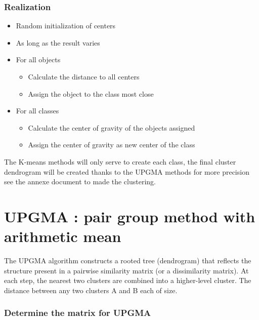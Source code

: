 \documentclass[12pt]{report}
\begin{document}
\subsubsection*{Realization}
\begin{itemize}
\item Random initialization of centers
\item As long as the result varies
\end{itemize}
\begin{itemize}
\item For all objects
\begin{itemize}
\item Calculate the distance to all centers
\item Assign the object to the class most close
\end{itemize}
\item For all classes
\begin{itemize}
\item Calculate the center of gravity of the objects assigned
\item Assign the center of gravity as new center of the class
\end{itemize}
\end{itemize}

\vspace{\baselineskip}

The K-means methods will only serve to create each class, the final cluster dendrogram will be created thanks to the UPGMA methods for more precision see the annexe document to made the clustering.

\newpage

\section*{UPGMA : pair group method with arithmetic mean}

The UPGMA algorithm constructs a rooted tree (dendrogram) that reflects the structure present in a pairwise similarity matrix (or a dissimilarity matrix). At each step, the nearest two clusters are combined into a higher-level cluster. 
The distance between any two clusters A and B each of size.

\subsubsection*{Determine the matrix for UPGMA}
\end{document}
